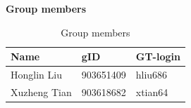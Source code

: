 \documentclass[11pt]{article}
\begin{document}
\textbf{Group members}

\begin{table}[ht]
    \centering
    \begin{tabular}{lll}
        \toprule
        Name         & gID 	 & GT-login \\
        \midrule
        Honglin Liu  & 903651409 & hliu686 \\
        Xuzheng Tian & 903618682 & xtian64 \\
        \bottomrule
    \end{tabular}
    \caption{Group members}
    \label{tab_group_members}
\end{table}
\end{document}
